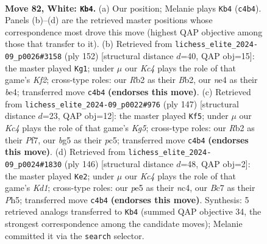 \documentclass[11pt]{article}
\begin{document}
\clearpage

\begin{figure}[p]\centering
\begin{subfigure}{0.46\textwidth}\centering
\resizebox{\linewidth}{!}{%
\newchessgame
\chessboard[
  setfen={8/2B5/3pk2p/4p1b1/2K1n2p/5r2/1R6/8 w - - 0 82},
  showmover=false,
  pgfstyle=straightmove, color=movearrow, markmove={c4-b4}
]}
\caption{}
\end{subfigure}\hfill
\begin{subfigure}{0.46\textwidth}\centering
\resizebox{\linewidth}{!}{%
\newchessgame
\chessboard[
  setfen={8/8/R1nbk1p1/7p/4bp1P/8/1B3K2/8 w - - 0 77},
  showmover=false,
  pgfstyle=straightmove, color=movearrow, markmove={f2-g1}
]}
\caption{}
\end{subfigure}
\\[4pt]
\begin{subfigure}{0.46\textwidth}\centering
\resizebox{\linewidth}{!}{%
\newchessgame
\chessboard[
  setfen={3b4/5p2/3P1P2/2P5/3BN1k1/3K4/8/8 b - - 0 74},
  showmover=false,
  pgfstyle=straightmove, color=movearrow, markmove={g4-f5}
]}
\caption{}
\end{subfigure}\hfill
\begin{subfigure}{0.46\textwidth}\centering
\resizebox{\linewidth}{!}{%
\newchessgame
\chessboard[
  setfen={8/6p1/7p/6pP/2n5/2k5/3p4/3K4 w - - 4 74},
  showmover=false,
  pgfstyle=straightmove, color=movearrow, markmove={d1-e2}
]}
\caption{}
\end{subfigure}
\caption{\textbf{Move 82, White: \texttt{Kb4}.} (a) Our position; Melanie plays \texttt{Kb4} (\texttt{c4b4}). Panels (b)--(d) are the retrieved master positions whose correspondence most drove this move (highest QAP objective among those that transfer to it). (b) Retrieved from \texttt{lichess\_elite\_2024-09\_p0026\#3158} (ply 152) [structural distance $d$=40, QAP obj=15]: the master played \texttt{Kg1}; under $\mu$ our \emph{Kc4} plays the role of that game's \emph{Kf2}; cross-type roles: our \emph{R}b2 as their \emph{B}b2, our \emph{n}e4 as their \emph{b}e4; transferred move \texttt{c4b4} \textbf{(endorses this move)}. (c) Retrieved from \texttt{lichess\_elite\_2024-09\_p0022\#976} (ply 147) [structural distance $d$=23, QAP obj=12]: the master played \texttt{Kf5}; under $\mu$ our \emph{Kc4} plays the role of that game's \emph{Kg5}; cross-type roles: our \emph{R}b2 as their \emph{P}f7, our \emph{b}g5 as their \emph{p}c5; transferred move \texttt{c4b4} \textbf{(endorses this move)}. (d) Retrieved from \texttt{lichess\_elite\_2024-09\_p0024\#1830} (ply 146) [structural distance $d$=48, QAP obj=2]: the master played \texttt{Ke2}; under $\mu$ our \emph{Kc4} plays the role of that game's \emph{Kd1}; cross-type roles: our \emph{p}e5 as their \emph{n}c4, our \emph{B}c7 as their \emph{P}h5; transferred move \texttt{c4b4} \textbf{(endorses this move)}. Synthesis: 5 retrieved analogs transferred to \texttt{Kb4} (summed QAP objective 34, the strongest correspondence among the candidate moves); Melanie committed it via the \texttt{search} selector.}
\label{fig:thought-m162}
\end{figure}
\end{document}
